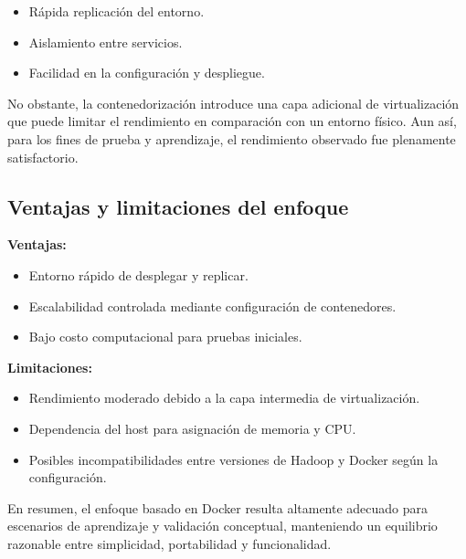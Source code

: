\begin{itemize}
    \item R\'apida replicaci\'on del entorno.
    \item Aislamiento entre servicios.
    \item Facilidad en la configuraci\'on y despliegue.
\end{itemize}

No obstante, la contenedorizaci\'on introduce una capa adicional de virtualizaci\'on que puede limitar el rendimiento en comparaci\'on con un entorno f\'isico. Aun as\'i, para los fines de prueba y aprendizaje, el rendimiento observado fue plenamente satisfactorio.

\subsection{Ventajas y limitaciones del enfoque}
\textbf{Ventajas:}

\begin{itemize}
    \item Entorno r\'apido de desplegar y replicar.
    \item Escalabilidad controlada mediante configuraci\'on de contenedores.
    \item Bajo costo computacional para pruebas iniciales.
\end{itemize}

\textbf{Limitaciones:}

\begin{itemize}
    \item Rendimiento moderado debido a la capa intermedia de virtualizaci\'on.
    \item Dependencia del host para asignaci\'on de memoria y CPU.
    \item Posibles incompatibilidades entre versiones de Hadoop y Docker seg\'un la configuraci\'on.
\end{itemize}

En resumen, el enfoque basado en Docker resulta altamente adecuado para escenarios de aprendizaje y validaci\'on conceptual, manteniendo un equilibrio razonable entre simplicidad, portabilidad y funcionalidad.
